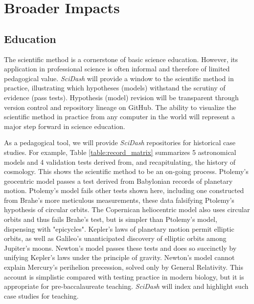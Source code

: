 \documentclass[11pt,letterpaper]{article}
\begin{document}
\section{Broader Impacts}
\subsection{Education}
The scientific method is a cornerstone of basic science education.  However, its application in professional science is often informal and therefore of limited pedagogical value.    \textit{SciDash} will provide a window to the scientific method in practice, illustrating which hypotheses (models) withstand the scrutiny of evidence (pass tests).  Hypothesis (model) revision will be transparent through version control and repository lineage on GitHub.  The ability to visualize the scientific method in practice from any computer in the world will represent a major step forward in science education.  

As a pedagogical tool, we will provide \textit{SciDash} repositories for historical case studies.  For example, Table \ref{table:record_matrix} summarizes 5 astronomical models and 4 validation tests derived from, and recapitulating, the history of cosmology.  This shows the scientific method to be an on-going process.  Ptolemy's geocentric model\cite{ptolemy_almagest_150} passes a test derived from Babylonian records of planetary motion.  Ptolemy's model fails other tests shown here, including one constructed from Brahe's more meticulous measurements\cite{kepler_rudolphine_1627}, these data falsifying Ptolemy's hypothesis of circular orbits.  The Copernican heliocentric model\cite{copernicus_revolutionibus_1543} also uses circular orbits and thus fails Brahe's test, but is simpler than Ptolemy's model, dispensing with "epicycles".  Kepler's laws of planetary motion permit elliptic orbits\cite{kepler_astronomia_1609}, as well as Galileo's unanticipated discovery of elliptic orbits among Jupiter's moons\cite{galilei_siderius_1610}.  Newton's model passes these tests and does so succinctly by unifying Kepler's laws under the principle of gravity\cite{newton_philosophiae_1687}.  Newton's model cannot explain Mercury's perihelion precession\cite{le_verrier_lettre_1859}, solved only by General Relativity\cite{einstein_foundation_1916}.  This account is simplistic compared with testing practice in modern biology, but it is appropriate for pre-baccalaureate teaching.  \textit{SciDash} will index and highlight such case studies for teaching.  
\end{document}
